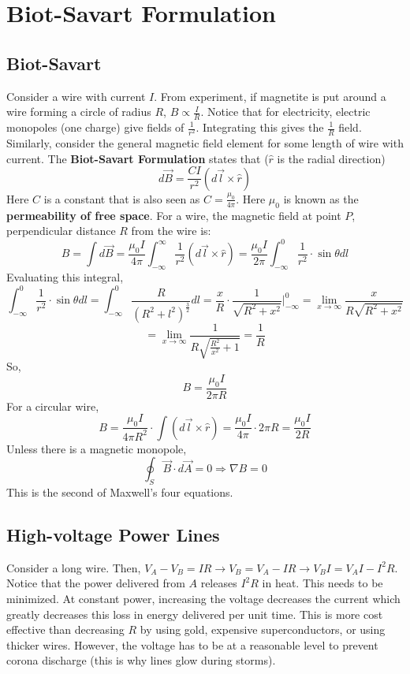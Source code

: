 \documentclass{article}
\begin{document}
\section{Biot-Savart Formulation}
\subsection{Biot-Savart}
Consider a wire with current $I$. From experiment, if magnetite is put around a wire forming a circle of radius $R$,
$B\propto\frac{I}{R}$. Notice that for electricity, electric monopoles (one charge) give fields of $\frac{1}{r^{2}}$.
Integrating this gives the $\frac{1}{R}$ field. Similarly, consider the general magnetic field element for some length of
wire with current. The \textbf{Biot-Savart Formulation} states that ($\hat{r}$ is the radial direction)
$$d\vec{B}=\frac{CI}{r^{2}}(d\vec{l}\times\hat{r})$$
Here $C$ is a constant that is also seen as $C=\frac{\mu_{0}}{4\pi}$.
Here $\mu_0$ is known as the \textbf{permeability of free space}. For a wire, the magnetic field at point $P$, perpendicular
distance $R$ from the wire is:
$$B=\int d\vec{B}=\frac{\mu_{0}I}{4\pi}\int_{-\infty}^{\infty}\frac{1}{r^{2}}(d\vec{l}\times \hat{r})
=\frac{\mu_{0}I}{2\pi}\int_{-\infty}^{0}\frac{1}{r^{2}}\cdot \sin\theta dl$$
Evaluating this integral,
$$\int_{-\infty}^{0}\frac{1}{r^{2}}\cdot \sin\theta dl=\int_{-\infty}^{0}\frac{R}{(R^{2}+l^{2})^{\frac{3}{2}}}dl
=\frac{x}{R}\cdot\frac{1}{\sqrt{R^{2}+x^{2}}}\biggr\vert_{-\infty}^{0}
=\lim_{x\rightarrow\infty}\frac{x}{R\sqrt{R^{2}+x^{2}}}$$
$$=\lim_{x\rightarrow\infty}\frac{1}{R\sqrt{\frac{R^{2}}{x^{2}}+1}}=\frac{1}{R}$$
So, 
$$B=\frac{\mu_{0}I}{2\pi R}$$
For a circular wire,
$$B=\frac{\mu_{0}I}{4\pi R^{2}}\cdot\int (d\vec{l}\times\hat{r})
=\frac{\mu_{0}I}{4\pi}\cdot 2\pi R=\frac{\mu_{0}I}{2R}$$
Unless there is a magnetic monopole,
$$\boxed{\oint_{S}\vec{B}\cdot d\vec{A}=0 \Rightarrow \nabla B=0}$$
This is the second of Maxwell's four equations.

\subsection{High-voltage Power Lines}
Consider a long wire. Then, $V_{A}-V_{B}=IR\rightarrow V_{B}=V_{A}-IR \rightarrow V_{B}I=V_{A}I-I^{2}R$.
Notice that the power delivered from $A$ releases $I^{2}R$ in heat. This needs to be minimized. At constant
power, increasing the voltage decreases the current which greatly decreases this loss in energy delivered per unit time.
This is more cost effective than decreasing $R$ by using gold, expensive superconductors, or using thicker wires.
However, the voltage has to be at a reasonable level to prevent corona discharge (this is why lines glow during storms).
\end{document}
